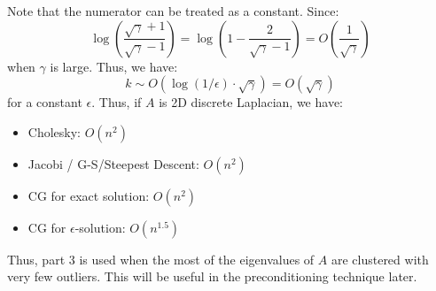 \documentclass[../main/main.tex]{subfiles}
\begin{document}
Note that the numerator can be treated as a constant. Since: \[
 \log \left( \frac{\sqrt{\gamma }+1}{\sqrt{\gamma }-1} \right) = \log \left(1- \frac{2}{\sqrt{\gamma }-1} \right) = O \left(\frac{1}{\sqrt{\gamma }}\right)
\] when $\gamma  $ is large. Thus, we have: \[
k \sim O(\log (1 / \epsilon) \cdot \sqrt{\gamma }) = O(\sqrt{\gamma })
\] for a constant $\epsilon  $.
Thus, if $A$ is 2D discrete Laplacian, we have:
\begin{itemize}
\item Cholesky: $O(n^2)$
        \item Jacobi / G-S/Steepest Descent: $O(n^2)$
        \item CG for exact solution: $O(n^2)$
        \item CG for $\epsilon$-solution: $O(n^{1.5})$
\end{itemize}
Thus, part 3 is used when the most of the eigenvalues of $A$ are clustered with very few outliers. This will be useful in the preconditioning technique later.
\end{document}
